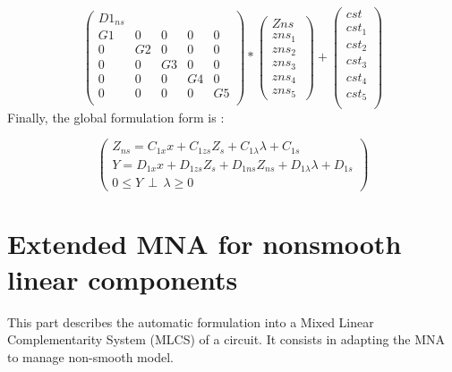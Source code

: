 \[
\left(\begin{array}{ccccc}
  D1_{ns}\\
  \hline
  G1&0&0&0&0\\
  0&G2&0&0&0\\
  0&0&G3&0&0\\
  0&0&0&G4&0\\
  0&0&0&0&G5\\
\end{array}\right)*
\left(\begin{array}{c}
  Zns\\
  \hline
   zns_{1} \\
   zns_{2}\\
   zns_{3}\\
   zns_{4}\\
   zns_{5}\
\end{array}\right)+
\left(\begin{array}{c}
  cst\\
  \hline
   cst_{1} \\
   cst_{2}\\
   cst_{3}\\
   cst_{4}\\
   cst_{5}\\
\end{array}\right)
\]
Finally, the global formulation form is : 

\[\left(\begin{array}{c}
Z_{ns}= C_{1x}x+C_{1zs}Z_{s}+C_{1\lambda}\lambda +C_{1s}\\
Y=D_{1x}x +D_{1zs}Z_{s}+D_{1ns}Z_{ns}+D_{1\lambda}\lambda+D_{1s}\\
0 \leq Y \, \perp \, \lambda \geq 0
\end{array}\right)\]
\newpage
\section{Extended MNA for nonsmooth linear components}
This part describes the automatic formulation into a Mixed Linear Complementarity System (MLCS) of a circuit. It consists in adapting the MNA to manage non-smooth model.

